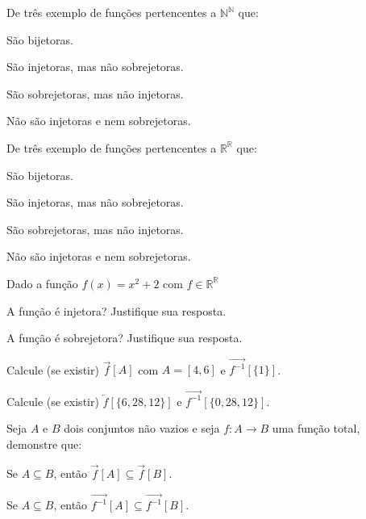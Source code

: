 \begin{questao}\label{prob:Funcao8.1}
	De três exemplo de funções pertencentes a $\mathbb{N}^\mathbb{N}$ que:
\end{questao}

\begin{exerList}
	\item São bijetoras.
	\item São injetoras, mas não sobrejetoras.
	\item São sobrejetoras, mas não injetoras.
	\item Não são injetoras e nem sobrejetoras.
\end{exerList}

\begin{questao}\label{prob:Funcao8.2}
	De três exemplo de funções pertencentes a $\mathbb{R}^\mathbb{R}$ que:
\end{questao}

\begin{exerList}
	\item São bijetoras.
	\item São injetoras, mas não sobrejetoras.
	\item São sobrejetoras, mas não injetoras.
	\item Não são injetoras e nem sobrejetoras.
\end{exerList}

\begin{questao}\label{prob:Funcao8.3}
	Dado a função $f(x) = x^2 + 2$ com $f \in \mathbb{R}^\mathbb{R}$
\end{questao}

\begin{exerList}
	\item A função é injetora? Justifique sua resposta.
	\item A função é sobrejetora? Justifique sua resposta.
	\item Calcule (se existir) $\overrightarrow{f}[A]$ com $A = [4, 6]$ e $\overrightarrow{f^{-1}}[\{1\}]$.
	\item Calcule (se existir) $\overleftarrow{f}[\{6, 28, 12\}]$ e $\overrightarrow{f^{-1}}[\{0, 28, 12\}]$.
\end{exerList}

\begin{questao}\label{prob:Funcao9}
  Seja $A$ e $B$ dois conjuntos não vazios e seja $f: A \rightarrow B$ uma função total, demonstre que:
\end{questao}

\begin{exerList}
	\item Se $A \subseteq B$, então $\overrightarrow{f} [A] \subseteq \overrightarrow{f}[B]$.
	\item Se $A \subseteq B$, então $\overrightarrow{f^{-1}} [A] \subseteq \overrightarrow{f^{-1}}[B]$.
\end{exerList}

